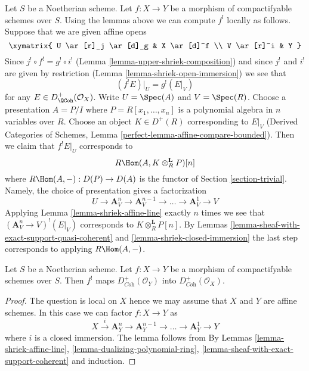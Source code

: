 \begin{remark}
\label{remark-local-calculation-shriek}
Let $S$ be a Noetherian scheme. Let $f : X \to Y$ be a morphism of
compactifyable schemes over $S$. Using the lemmas above we can compute
$f^!$ locally as follows. Suppose that we are given affine opens
$$
\xymatrix{
U \ar[r]_j \ar[d]_g & X \ar[d]^f \\
V \ar[r]^i & Y
}
$$
Since $j^! \circ f^! = g^! \circ i^!$
(Lemma \ref{lemma-upper-shriek-composition})
and since $j^!$ and $i^!$ are given by restriction
(Lemma \ref{lemma-shriek-open-immersion})
we see that
$$
(f^!E)|_U = g^!(E|_V)
$$
for any $E \in D^+_\QCoh(\mathcal{O}_X)$. Write
$U = \Spec(A)$ and $V = \Spec(R)$.
Choose a presentation $A = P/I$ where $P = R[x_1, \ldots, x_n]$
is a polynomial algebra in $n$ variables over $R$. Choose an
object $K \in D^+(R)$ corresponding to $E|_V$
(Derived Categories of Schemes, Lemma
\ref{perfect-lemma-affine-compare-bounded}).
Then we claim that $f^!E|_U$ corresponds to
$$
R\Hom(A, K \otimes_R^\mathbf{L} P)[n]
$$
where $R\Hom(A, -) : D(P) \to D(A)$ is the functor of
Section \ref{section-trivial}. Namely, the choice of presentation
gives a factorization
$$
U \rightarrow \mathbf{A}^n_V \to \mathbf{A}^{n - 1}_V \to \ldots \to
\mathbf{A}^1_V \to V
$$
Applying Lemma \ref{lemma-shriek-affine-line} exactly $n$ times we see that
$(\mathbf{A}^n_V \to V)^!(E|_V)$ corresponds to
$K \otimes_R^\mathbf{L} P[n]$. By Lemmas
\ref{lemma-sheaf-with-exact-support-quasi-coherent} and
\ref{lemma-shriek-closed-immersion} the last step corresponds to
applying $R\Hom(A, -)$.
\end{remark}

\begin{lemma}
\label{lemma-shriek-coherent}
Let $S$ be a Noetherian scheme. Let $f : X \to Y$ be a morphism
of compactifyable schemes over $S$. Then $f^!$ maps
$D_{\textit{Coh}}^+(\mathcal{O}_Y)$ into $D_{\textit{Coh}}^+(\mathcal{O}_X)$.
\end{lemma}

\begin{proof}
The question is local on $X$ hence we may assume that $X$ and $Y$ are
affine schemes. In this case we can factor $f : X \to Y$ as
$$
X \xrightarrow{i} \mathbf{A}^n_Y \to \mathbf{A}^{n - 1}_Y \to \ldots \to
\mathbf{A}^1_Y \to Y
$$
where $i$ is a closed immersion. The lemma follows from
By Lemmas \ref{lemma-shriek-affine-line},
\ref{lemma-dualizing-polynomial-ring},
\ref{lemma-sheaf-with-exact-support-coherent} and induction.
\end{proof}

